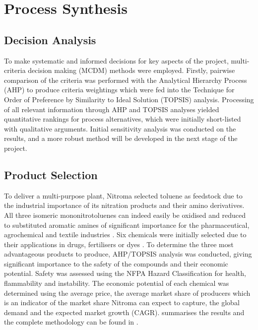 \section{Process Synthesis }
\label{sec:synthesis}
\subsection{Decision Analysis}

To make systematic and informed decisions for key aspects of the project, multi-criteria decision making (MCDM) methods were employed. Firstly, pairwise comparison of the criteria was performed with the Analytical Hierarchy Process (AHP) to produce criteria weightings which were fed into the Technique for Order of Preference by Similarity to Ideal Solution (TOPSIS) analysis. Processing of all relevant information through AHP and TOPSIS analyses yielded quantitative rankings for process alternatives, which were initially short-listed with qualitative arguments. Initial sensitivity analysis was conducted on the results, and a more robust method will be developed in the next stage of the project.


\subsection{Product Selection}
To deliver a multi-purpose plant, Nitroma selected toluene as feedstock due to the industrial importance of its nitration products and their amino derivatives. All three isomeric mononitrotoluenes can indeed easily be oxidised and reduced to substituted aromatic amines of significant importance for the pharmaceutical, agrochemical and textile industries \cite{dugal_nitrobenzene_2005}. Six chemicals were initially selected due to their applications in drugs, fertilisers or dyes \cite{bowers_toluidines_2000,bruhne_benzaldehyde_2011,maki_benzoic_2000}. To determine the three most advantageous products to produce, AHP/TOPSIS analysis was conducted, giving significant importance to the safety of the compounds and their economic potential. Safety was assessed using the NFPA Hazard Classification for health, flammability and instability. The economic potential of each chemical was determined using the average price, the average market share of producers which is an indicator of the market share Nitroma can expect to capture, the global demand and the expected market growth (CAGR).  summarises the results and the complete methodology can be found in .

